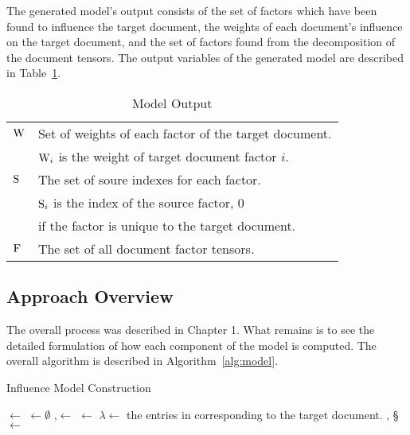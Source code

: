 \documentclass[../ut-dissertation.tex]{subfiles}
\begin{document}
The generated model's output consists of the set of factors which have
been found to influence the target document, the weights of each
document's influence on the target document, and the set of factors
found from the decomposition of the document tensors.  The output variables of
the generated model are described in Table~\ref{table:modelOutput}.
\begin{table}
  \begin{tabular}{ll}
    \hline
    $\mathrm{W}$ & Set of weights of each factor of the target document.\\
              & $\mathrm{W}_i$ is the weight of target document factor $i$.\\
    $\mathrm{S}$ & The set of soure indexes for each factor.\\
              & $\mathrm{S}_i$ is the index of the source factor, 0 \\
              & if the factor is unique to the target document.\\
    $\mathrm{F}$ & The set of all document factor tensors.\\
    \hline
  \end{tabular}
  \caption{Model Output}
  \label{table:modelOutput}
\end{table}

\subsection{Approach Overview}
The overall process was described in Chapter 1.  What remains is to
see the detailed formulation of how each component of the model is
computed.  The overall algorithm is described in
Algorithm~\ref{alg:model}.  
\begin{algorithm}
  \caption{Influence Model Construction}
  \label{alg:model}

   
   
   
  
  \Output{\W, \S, \F}
  \BlankLine
  \;
  \V $\leftarrow$ \;
  \C $\leftarrow\emptyset$\;
  \LN,\F $\leftarrow$ \;
  \DM $\leftarrow$ \DistanceMatrix{\F}\;
  $\lambda \leftarrow$ the entries in \LN corresponding to the target document.\;
  \W, \S $\leftarrow$ \;
  \Return{\W, \S, \F}\;
\end{algorithm}
\end{document}
